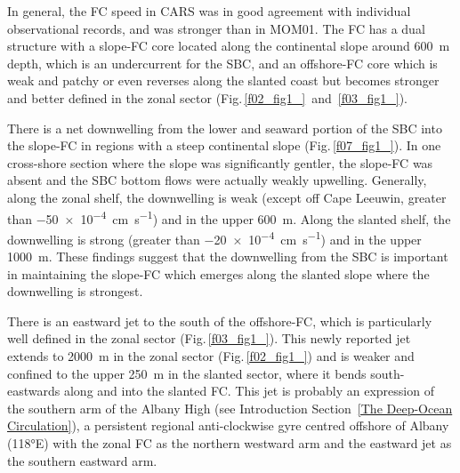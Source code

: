 \documentclass[preprint,3p,review,12pt]{elsarticle}
\begin{document}
In general, the FC speed in CARS was in good agreement with individual observational records, and was stronger than in MOM01.
The FC has a dual structure with a slope-FC core located along the continental slope around \SI{600}{\meter} depth, which is an undercurrent for the SBC, and an offshore-FC core 
which is weak and patchy or even reverses along the slanted coast but becomes stronger and better defined in the zonal sector (Fig.\,\ref{f02_fig1_}~and~\ref{f03_fig1_}).

There is a net downwelling
from the lower and seaward portion of the SBC into the slope-FC
in regions with a steep continental slope (Fig.\,\ref{f07_fig1_}).
In one cross-shore section where the slope was significantly gentler, the slope-FC was absent and the SBC bottom flows were actually weakly upwelling. Generally, along the zonal shelf, the downwelling is weak (except off Cape Leeuwin, greater than \SI{-50 e-4}{\centi\meter\per\second}) and in the upper \SI{600}{\meter}. Along the slanted shelf, the downwelling is strong (greater than \SI{-20 e-4}{\centi\meter\per\second}) and in the upper \SI{1000}{\meter}. These findings suggest that the downwelling from the SBC is important in maintaining the slope-FC which emerges along the slanted slope where the downwelling is strongest.

There is an eastward jet to the south of the offshore-FC, which is particularly well defined in the zonal sector (Fig.\,\ref{f03_fig1_}).
This newly reported jet extends
to \SI{2000}{\meter} in the zonal sector (Fig.\,\ref{f02_fig1_}) and is weaker and confined to the upper \SI{250}{\meter} in the slanted sector,
where it bends south-eastwards along and into the slanted FC\@.
This jet is probably an expression of the southern arm
of the Albany High (see Introduction Section~\ref{The Deep-Ocean Circulation}),
a persistent regional anti-clockwise gyre centred offshore of Albany (\ang{118}E) with the zonal FC as the northern westward arm and the eastward jet as the southern eastward arm.
\end{document}
